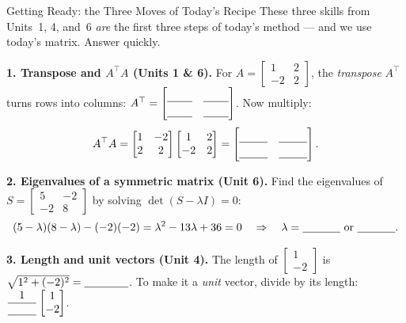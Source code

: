 \documentclass[10pt]{article}
\newcommand{\T}{^{\top}}
\begin{document}
\namedateperiod

\vspace{0.12in}

\begin{notesbox}{Getting Ready: the Three Moves of Today's Recipe}
\small These three skills from Units~1, 4, and~6 \emph{are} the first three steps of today's method ---
and we use today's matrix. Answer quickly.

\vspace{4pt}
\textbf{1. Transpose and $A\T A$ (Units 1 \& 6).} For $A=\begin{bmatrix} 1 & 2 \\ -2 & 2 \end{bmatrix}$,
the \emph{transpose} $A\T$ turns rows into columns: $A\T=\begin{bmatrix}\rule{0pt}{1.1em}\blank{0.8cm} & \blank{0.8cm}\\[2pt]\blank{0.8cm} & \blank{0.8cm}\end{bmatrix}$.
Now multiply:
\[
  A\T A=\begin{bmatrix} 1 & -2 \\ 2 & 2 \end{bmatrix}\begin{bmatrix} 1 & 2 \\ -2 & 2 \end{bmatrix}
  = \begin{bmatrix}\rule{0pt}{1.1em}\blank{0.9cm} & \blank{0.9cm}\\[2pt]\blank{0.9cm} & \blank{0.9cm}\end{bmatrix}.
\]

\vspace{4pt}
\textbf{2. Eigenvalues of a symmetric matrix (Unit 6).} Find the eigenvalues of
$S=\begin{bmatrix} 5 & -2 \\ -2 & 8 \end{bmatrix}$ by solving $\det(S-\lambda I)=0$:
\[
  (5-\lambda)(8-\lambda)-(-2)(-2)=\lambda^2-13\lambda+36=0 \quad\Rightarrow\quad
  \lambda=\blank{1.2cm}\ \text{or}\ \blank{1.2cm}.
\]

\vspace{4pt}
\textbf{3. Length and unit vectors (Unit 4).} The length of $\begin{bmatrix} 1 \\ -2 \end{bmatrix}$ is
$\sqrt{1^2+(-2)^2}=\blank{1.4cm}$. To make it a \emph{unit} vector, divide by its length:
$\dfrac{1}{\blank{0.9cm}}\begin{bmatrix} 1 \\ -2 \end{bmatrix}$.
\end{notesbox}
\end{document}
